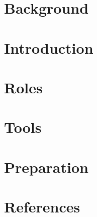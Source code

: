 \section[Back]{Background}


\section[Intro]{Introduction}


\section[Roles]{Roles}
% 



\section[Tools]{Tools}



\section[Prep]{Preparation}



\section[Refs]{References}
